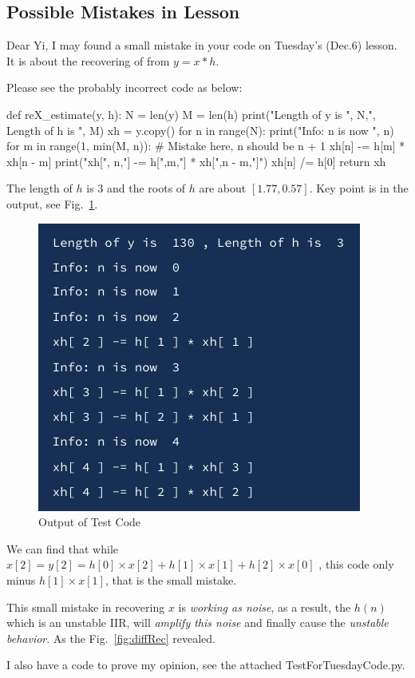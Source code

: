 \documentclass{article}
\begin{document}
\begin{appendices}
\section{Possible Mistakes in Lesson}
Dear Yi, I may found a small mistake in your code on Tuesday's (Dec.6) lesson. It is about the recovering of
from $y = x * h$. 

Please see the probably incorrect code as below:
\begin{python}
def reX_estimate(y, h):
	N = len(y)
	M = len(h)
	print("Length of y is ", N,", Length of h is ", M)
	xh = y.copy()
	for n in range(N):
		print("Info: n is now ", n)
		for m in range(1, min(M, n)): # Mistake here, n should be n + 1
			xh[n] -= h[m] * xh[n - m]
			print("xh[", n,"] -= h[",m,"] * xh[",n - m,"]")
		xh[n] /= h[0]
	return xh
\end{python}

The length of $h$ is $3$ and the roots of $h$ are about $[1.77, 0.57]$. Key point is in the output, see Fig.~\ref{fig:output}.

\begin{figure}[!h]
	\centering
	\includegraphics[width=2 in]{../pic/comparisonOutput.png}
	\caption{Output of Test Code}
	\label{fig:output}
\end{figure}

We can find that while $\hat{x}[2] = y[2] = h[0] \times x[2] + h[1]\times x[1] + h[2] \times x[0]$ , this code only minus $h[1] \times x[1]$, that is the small mistake.

This small mistake in recovering $x$ is \emph{working as noise}, as a result, the $h(n)$ which is an unstable IIR, will \emph{amplify this noise} and finally cause the \emph{unstable behavior}. As the Fig.~\ref{fig:diffRec} revealed.

I also have a code to prove my opinion, see the attached {TestForTuesdayCode.py}.


\end{appendices}
\end{document}
